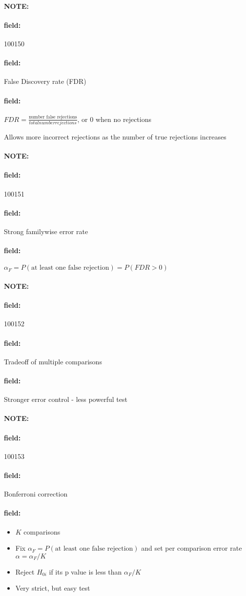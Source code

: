 \documentclass[12pt]{article}
\newenvironment{note}{\paragraph{NOTE:}}{}
\newenvironment{field}{\paragraph{field:}}{}
\begin{document}
\begin{note}
 \begin{field}
  \tiny 100150
 \end{field}
 \begin{field}
  False Discovery rate (FDR)
 \end{field}
 \begin{field}
  $FDR = \frac{\text{number false rejections}}{total number rejections}$,
  or 0 when no rejections

  Allows more incorrect rejections as the number of true rejections increases
 \end{field}
\end{note}



\begin{note}
 \begin{field}
  \tiny 100151
 \end{field}
 \begin{field}
  Strong familywise error rate
 \end{field}
 \begin{field}
  $\alpha_F = P(\text{at least one false rejection}) = P(FDR > 0)$
 \end{field}
\end{note}

\begin{note}
 \begin{field}
  \tiny 100152
 \end{field}
 \begin{field}
  Tradeoff of multiple comparisons
 \end{field}
 \begin{field}
  Stronger error control - less powerful test
 \end{field}
\end{note}

\begin{note}
 \begin{field}
  \tiny 100153
 \end{field}
 \begin{field}
  Bonferroni correction
 \end{field}
 \begin{field}
  \begin{itemize}
   \item $K$ comparisons
   \item Fix $\alpha_F = P(\text{at least one false rejection})$ and set per comparison error rate $\alpha = \alpha_F/K$
   \item Reject $H_{0i}$ if its p value is less than $\alpha_F/K$
   \item Very strict, but easy test
  \end{itemize}
 \end{field}
\end{note}
\end{document}
